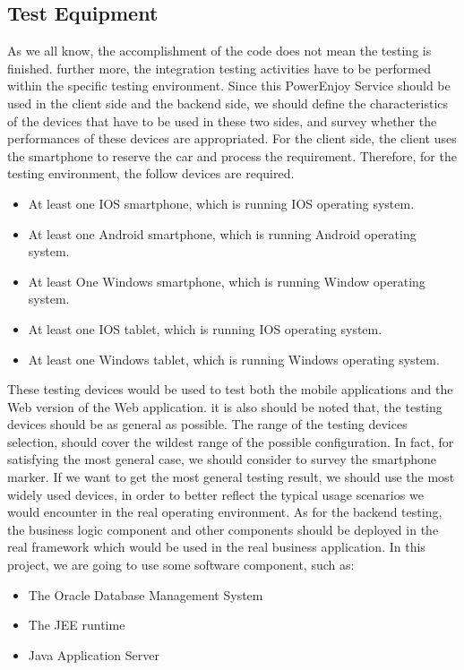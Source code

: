 \documentclass{article}
\begin{document}
\subsection{Test Equipment}
As we all know, the accomplishment of the code does not mean the testing is finished. further more, the integration testing activities have to be performed within the specific testing environment.
\newline
Since this PowerEnjoy Service should be used in the client side and the backend side, we should define the characteristics of the devices that have to be used in these two sides, and survey whether the performances of these devices are appropriated.
\newline
For the client side, the client uses the smartphone to reserve the car and process the requirement. Therefore, for the testing environment, the follow devices are required.
\begin{itemize}
	\item At least one IOS smartphone, which is running IOS operating system.
	\item At least one Android smartphone, which is running Android operating system.
	\item At least One Windows smartphone, which is running Window operating system.
	\item At least one IOS tablet, which is running IOS operating system.
	\item At least one Windows tablet, which is running Windows operating system.
\end{itemize}
These testing devices would be used to test both the mobile applications and the Web version of the Web application. it is also should be noted that, the testing devices should be as general as possible. The range of the testing devices selection, should cover the wildest range of the possible configuration.
\newline
In fact, for satisfying the most general case, we should consider to survey the smartphone marker. If we want to get the most general testing result, we should use the most widely used devices, in order to better reflect the typical usage scenarios we would encounter in the real operating environment.
\newline
As for the backend testing, the business logic component and other components should be deployed in the real framework which would be used in the real business application. In this project, we are going to use some software component, such as:
\begin{itemize}
	\item The Oracle Database Management System
	\item The JEE runtime
	\item Java Application Server
\end{itemize}
\end{document}
